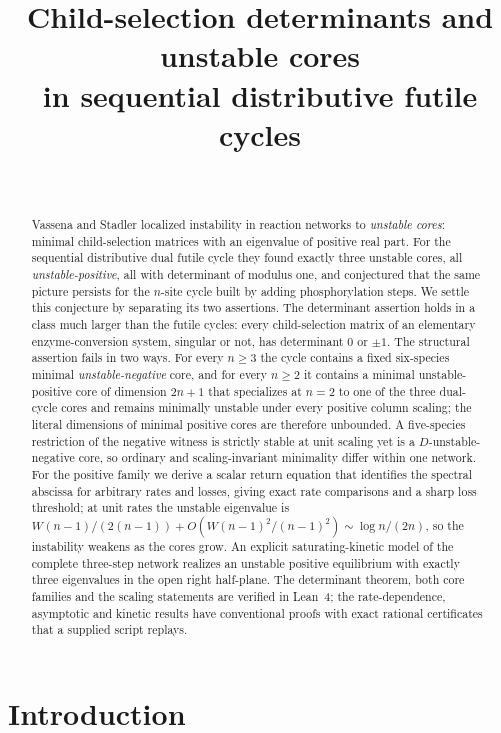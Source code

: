 \documentclass[11pt,a4paper]{article}
\title{Child-selection determinants and unstable cores\\in sequential distributive futile cycles}
\author{\PaperAuthor\\[2pt]\small\PaperAffiliation}
\date{\PaperDate}
\theoremstyle{plain}
\theoremstyle{definition}
\theoremstyle{remark}
\begin{document}
\maketitle

\begin{abstract}
Vassena and Stadler localized instability in reaction networks to \emph{unstable cores}: minimal child-selection matrices with an eigenvalue of positive real part. For the sequential distributive dual futile cycle they found exactly three unstable cores, all \emph{unstable-positive}, all with determinant of modulus one, and conjectured that the same picture persists for the $n$-site cycle built by adding phosphorylation steps. We settle this conjecture by separating its two assertions. The determinant assertion holds in a class much larger than the futile cycles: every child-selection matrix of an elementary enzyme-conversion system, singular or not, has determinant $0$ or $\pm1$. The structural assertion fails in two ways. For every $n\ge3$ the cycle contains a fixed six-species minimal \emph{unstable-negative} core, and for every $n\ge2$ it contains a minimal unstable-positive core of dimension $2n+1$ that specializes at $n=2$ to one of the three dual-cycle cores and remains minimally unstable under every positive column scaling; the literal dimensions of minimal positive cores are therefore unbounded. A five-species restriction of the negative witness is strictly stable at unit scaling yet is a $D$-unstable-negative core, so ordinary and scaling-invariant minimality differ within one network. For the positive family we derive a scalar return equation that identifies the spectral abscissa for arbitrary rates and losses, giving exact rate comparisons and a sharp loss threshold; at unit rates the unstable eigenvalue is $W(n-1)/(2(n-1))+O(W(n-1)^2/(n-1)^2)\sim\log n/(2n)$, so the instability weakens as the cores grow. An explicit saturating-kinetic model of the complete three-step network realizes an unstable positive equilibrium with exactly three eigenvalues in the open right half-plane. The determinant theorem, both core families and the scaling statements are verified in Lean~4; the rate-dependence, asymptotic and kinetic results have conventional proofs with exact rational certificates that a supplied script replays.
\end{abstract}

\section{Introduction}\label{sec:intro}
\end{document}

